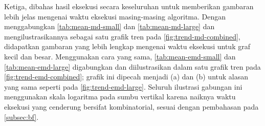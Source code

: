 \begin{center}
	\renewcommand{\minipagewidth}{0.475\linewidth}

	\vphantom{}
	\vfill

	
	\hspace{1em}
	

	\vspace{2em}

	
	\hspace{1em}
	

	\vspace{2em}

	\renewcommand{\minipagewidth}{\linewidth}
	

	\vfill \vfill \vfill
\end{center}

\begin{landscape}
\begin{center}
	\renewcommand{\minipagewidth}{0.475\linewidth}

	\vphantom{}
	\vfill

	
	\hspace{2em}
	

	\vspace{2em}

	
	\hspace{2em}
	

	\vfill \vfill \vfill
\end{center}
\end{landscape}

Ketiga, dibahas hasil eksekusi secara keseluruhan untuk memberikan gambaran lebih jelas mengenai waktu eksekusi masing-masing algoritma. Dengan menggabungkan \autoref{tab:mean-md-small} dan \autoref{tab:mean-md-large} dan mengilustrasikannya sebagai satu grafik tren pada \autoref{fig:trend-md-combined}, didapatkan gambaran yang lebih lengkap mengenai waktu eksekusi untuk graf kecil dan besar. Menggunakan cara yang sama, \autoref{tab:mean-emd-small} dan \autoref{tab:mean-emd-large} digabungkan dan diilustrasikan dalam satu grafik tren pada \autoref{fig:trend-emd-combined}; grafik ini dipecah menjadi (a) dan (b) untuk alasan yang sama seperti pada \autoref{fig:trend-emd-large}. Seluruh ilustrasi gabungan ini menggunakan skala logaritma pada sumbu vertikal karena naiknya waktu eksekusi yang cenderung bersifat kombinatorial, sesuai dengan pembahasan pada \autoref{subsec:bf}.

